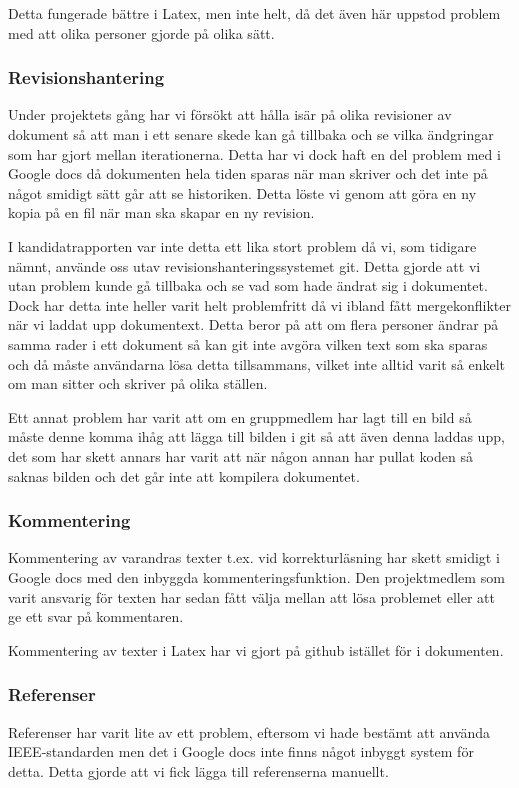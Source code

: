 Detta fungerade bättre i Latex, men inte helt, då det även här uppstod problem med att olika personer gjorde på olika sätt.

\subsubsection{Revisionshantering}
Under projektets gång har vi försökt att hålla isär på olika revisioner av dokument så att man i ett senare skede kan gå tillbaka och se vilka ändgringar som har gjort mellan iterationerna.
Detta har vi dock haft en del problem med i Google docs då dokumenten hela tiden sparas när man skriver och det inte på något smidigt sätt går att se historiken. Detta löste vi genom att göra en ny kopia på en fil när man ska skapar en ny revision.

I kandidatrapporten var inte detta ett lika stort problem då vi, som tidigare nämnt, använde oss utav revisionshanteringssystemet git. Detta gjorde att vi utan problem kunde gå tillbaka och se vad som hade ändrat sig i dokumentet. Dock har detta inte heller varit helt problemfritt då vi ibland fått mergekonflikter när vi laddat upp dokumentext. Detta beror på att om flera personer ändrar på samma rader i ett dokument så kan git inte avgöra vilken text som ska sparas och då måste användarna lösa detta tillsammans, vilket inte alltid varit så enkelt om man sitter och skriver på olika ställen.

Ett annat problem har varit att om en gruppmedlem har lagt till en bild så måste denne komma ihåg att lägga till bilden i git så att även denna laddas upp, det som har skett annars har varit att när någon annan har pullat koden så saknas bilden och det går inte att kompilera dokumentet.

\subsubsection{Kommentering}
Kommentering av varandras texter t.ex. vid korrekturläsning har skett smidigt i Google docs med den inbyggda kommenteringsfunktion. Den projektmedlem som varit ansvarig för texten har sedan fått välja mellan att lösa problemet eller att ge ett svar på kommentaren.

Kommentering av texter i Latex har vi gjort på github istället för i dokumenten.

\subsubsection{Referenser}
Referenser har varit lite av ett problem, eftersom vi hade bestämt att använda IEEE-standarden men det i Google docs inte finns något inbyggt system för detta. Detta gjorde att vi fick lägga till referenserna manuellt.

